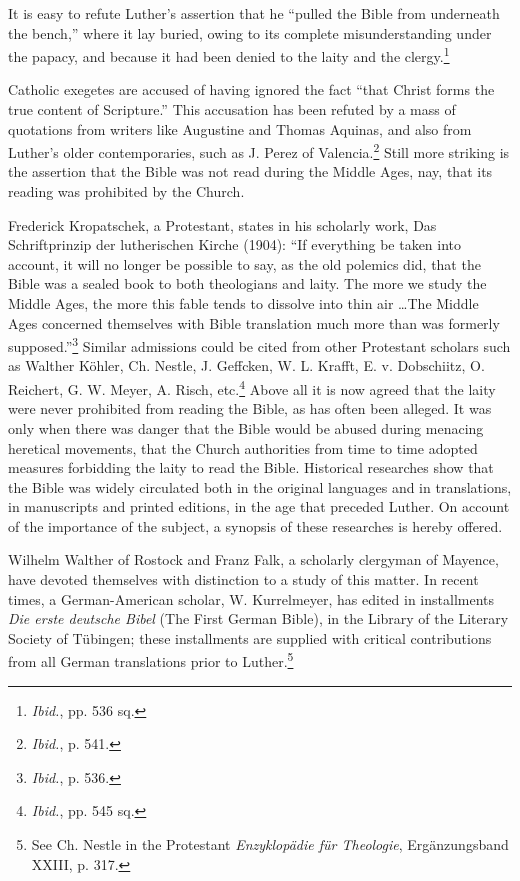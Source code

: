 It is easy to refute Luther’s assertion that he “pulled the Bible from
underneath the bench,” where it lay buried, owing to its complete
misunderstanding under the papacy, and because it had been denied
to the laity and the clergy.\footnote{\textit{Ibid.}, pp. 536 sq.}


Catholic exegetes are accused of having ignored the fact “that
Christ forms the true content of Scripture.” This accusation has been
refuted by a mass of quotations from writers like Augustine and
Thomas Aquinas, and also from Luther’s older contemporaries, such
as J. Perez of Valencia.\footnote{\textit{Ibid.}, p. 541.}
 Still more striking is the assertion that the
Bible was not read during the Middle Ages, nay, that its reading was
prohibited by the Church.

Frederick Kropatschek, a Protestant, states in his scholarly work,
Das Schriftprinzip der lutherischen Kirche (1904): “If everything
be taken into account, it will no longer be possible to say, as the old
polemics did, that the Bible was a sealed book to both theologians and
laity. The more we study the Middle Ages, the more this fable tends
to dissolve into thin air \dots The Middle Ages concerned themselves
with Bible translation much more than was formerly supposed.”\footnote{\textit{Ibid.}, p. 536.}
Similar admissions could be cited from other Protestant scholars
such as Walther Köhler, Ch. Nestle, J. Geffcken, W. L. Krafft, E.
v. Dobschiitz, O. Reichert, G. W. Meyer, A. Risch, etc.\footnote{\textit{Ibid.}, pp. 545 sq.}
Above all
it is now agreed that the laity were never prohibited from reading the
Bible, as has often been alleged. It was only when there was danger
that the Bible would be abused during menacing heretical movements,
that the Church authorities from time to time adopted measures forbidding
the laity to read the Bible. Historical researches show that the
Bible was widely circulated both in the original languages and in translations,
in manuscripts and printed editions, in the age that preceded
Luther. On account of the importance of the subject, a synopsis of
these researches is hereby offered.

Wilhelm Walther of Rostock and Franz Falk, a scholarly clergyman of
Mayence, have devoted themselves with distinction to a study of this matter.
In recent times, a German-American scholar, W. Kurrelmeyer, has edited
in installments \textit{Die erste deutsche Bibel} (The First German Bible), in the
Library of the Literary Society of Tübingen; these installments are supplied
with critical contributions from all German translations prior to Luther.\footnote
{See Ch. Nestle in the Protestant \textit{Enzyklopädie für Theologie}, Ergänzungsband XXIII,
p. 317.}


